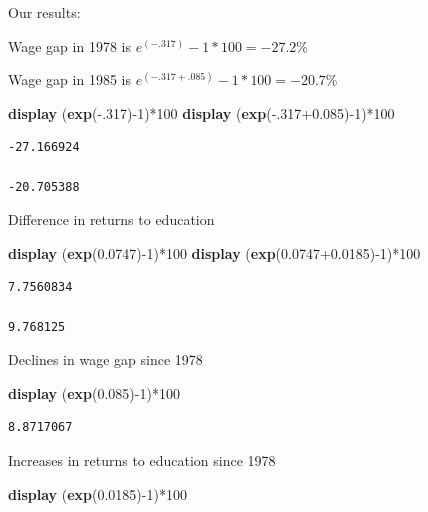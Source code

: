 \documentclass[
]{book}
\newenvironment{Shaded}{\begin{snugshade}}{\end{snugshade}}
\newcommand{\FunctionTok}[1]{\textcolor[rgb]{0.13,0.29,0.53}{\textbf{#1}}}
\newcommand{\KeywordTok}[1]{\textcolor[rgb]{0.13,0.29,0.53}{\textbf{#1}}}
\newcommand{\NormalTok}[1]{#1}
\begin{document}
Our results:

Wage gap in 1978 is \(e^{(-.317)}-1*100 = -27.2 \%\)

Wage gap in 1985 is \(e^{(-.317+.085)}-1*100 = -20.7 \%\)

\begin{Shaded}
\begin{Highlighting}[]
\KeywordTok{display}\NormalTok{ (}\FunctionTok{exp}\NormalTok{({-}.317){-}1)*100}
\KeywordTok{display}\NormalTok{ (}\FunctionTok{exp}\NormalTok{({-}.317+0.085){-}1)*100}
\end{Highlighting}
\end{Shaded}

\begin{verbatim}
-27.166924

-20.705388
\end{verbatim}

Difference in returns to education

\begin{Shaded}
\begin{Highlighting}[]
\KeywordTok{display}\NormalTok{ (}\FunctionTok{exp}\NormalTok{(0.0747){-}1)*100}
\KeywordTok{display}\NormalTok{ (}\FunctionTok{exp}\NormalTok{(0.0747+0.0185){-}1)*100}
\end{Highlighting}
\end{Shaded}

\begin{verbatim}
7.7560834

9.768125
\end{verbatim}

Declines in wage gap since 1978

\begin{Shaded}
\begin{Highlighting}[]
\KeywordTok{display}\NormalTok{ (}\FunctionTok{exp}\NormalTok{(0.085){-}1)*100}
\end{Highlighting}
\end{Shaded}

\begin{verbatim}
8.8717067
\end{verbatim}

Increases in returns to education since 1978

\begin{Shaded}
\begin{Highlighting}[]
\KeywordTok{display}\NormalTok{ (}\FunctionTok{exp}\NormalTok{(0.0185){-}1)*100}
\end{Highlighting}
\end{Shaded}
\end{document}
